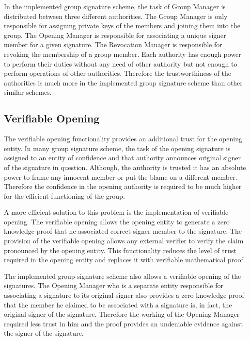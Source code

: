 In the implemented group signature scheme, the task of Group Manager is distributed between three different authorities. The Group Manager is only responsible for assigning private keys of the members and joining them into the group. The Opening Manager is responsible for associating a unique signer member for a given signature. The Revocation Manager is responsible for revoking the membership of a group member. Each authority has enough power to perform their duties without any need of other authority but not enough to perform operations of other authorities. Therefore the trustworthiness of the authorities is much more in the implemented group signature scheme than other similar schemes. 

\subsection{Verifiable Opening}
The verifiable opening functionality provides an additional trust for the opening entity. In many group signature scheme, the task of the opening signature is assigned to an entity of confidence and that authority announces original signer of the signature in question. Although,  the authority is trusted it has an absolute power to frame any innocent member or put the blame on a different member. Therefore the confidence in the opening authority is required to be much higher for the efficient functioning of the group.

A more efficient solution to this problem is the implementation of verifiable opening. The verifiable opening allows the opening entity to generate a zero knowledge proof that he associated correct signer member to the signature. The provision of the verifiable opening allows any external verifier to verify the claim pronounced by the opening entity. This functionality reduces the level of trust required in the opening entity and replaces it with verifiable mathematical proof. 

The implemented group signature scheme also allows a verifiable opening of the signatures. The  Opening Manager who is a separate entity responsible for associating a signature to its original signer also provides a zero knowledge proof that the member he claimed to be associated with a signature is, in fact, the original signer of the signature. Therefore the working of the Opening Manager required less trust in him and the proof provides an undeniable evidence against the signer of the signature.

